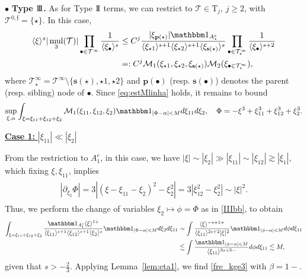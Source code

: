 \documentclass[a4paper,
11pt,  reqno]{amsart}
\newcommand{\II}{\textup{I \hspace{-2.9mm} I} }
\newcommand{\III}{\textup{I \hspace{-2.9mm} I \hspace{-2.9mm} I}}
\newcommand{\5}{\textup{V}}
\newcommand{\noi}{\noindent}
\newcommand{\ind}{\mathbbm 1}
\newcommand{\les}{\lesssim}
\theoremstyle{remark}
\newcommand{\bul}{\bullet}
\newcommand{\TT}{\mathcal{T}}
\newcommand{\Tr}{\mathrm{T}}
\newcommand{\al}{\alpha}
\newcommand{\be}{\beta}
\newcommand{\pb}{\mathbf{p}}
\newcommand{\sbf}{\mathbf{s}}
\newcommand{\ges}{\gtrsim}
\newcommand{\jb}[1]
{\langle #1 \rangle}
\newcommand{\ff}{\mathfrak{f}}
\DeclareMathOperator{\mul}{mul}
\numberwithin{equation}{section}
\numberwithin{theorem}{section}
\begin{document}
\smallskip

\noi
$\bul$ \textbf{Type $\III$.} As for Type $\II$ terms, we can restrict to $\TT\in \Tr_j$, $j\ge 2$,  with $\TT^{0,\ff}=\{\star\}$. In this case,
\begin{align}
    \jb{\xi}^s | \mul_3 (\TT)|
    \prod_{\bul \in \TT^\infty} \frac{1}{\jb{\xi_\bul}^s}
    &
    \le
    {C^j}
    \frac{|\xi_{\pb(\star)}|  \ind_{A_\star^c} }{ \jb{\xi_{\star1}}^{s+1} \jb{\xi_{\star2}}^{s+1} \jb{\xi_{\sbf(\star)}}^s} \prod_{\bul \in \TT^\infty_\star} \frac{1}{\jb{\xi_\bul}^{s+2}}
    \\
    &=: {C^j}
    \mathcal{M}_1(\xi_{\star1}, \xi_{\star2}, \xi_{\sbf(\star)})\mathcal{M}_2(\xi_{\bul\in \TT^\infty_\star})
    ,
\end{align}
where $\TT_\star^\infty=\TT^\infty\setminus\{\sbf(\star),\star1,\star2\}$ and $\pb(\bul)$ (resp. $\sbf(\bul)$) denotes the parent (resp. sibling) node of $\bul$. Since \eqref{eq:estMlinha} holds, it remains to bound
\begin{align}
\label{IIIbb}
\sup_{\xi, \alpha}
\int_{\xi=\xi_{11}+\xi_{12}+\xi_2} \mathcal{M}_1(\xi_{11}, \xi_{12}, \xi_{2})\ind_{|\Phi - \al| < M} d\xi_{11} d\xi_{2},\quad \Phi=-\xi^3+\xi_{11}^3+\xi_{12}^3+\xi_2^3.
\end{align}



\smallskip
\noi
\underline{\textbf{Case 1:} $|\xi_{11}| \ll |\xi_2|$}

{From the restriction to $A_1^c$,}
in this case, we have $|\xi| \sim |\xi_2| \gg  |\xi_{11}| \sim |\xi_{12}| \ges |\xi_1|$, which fixing $\xi, \xi_{11}$, implies
\begin{align}\label{IIIb}
\begin{split}
|
\partial_{\xi_{2}} \Phi|
= 3 | (\xi-\xi_{11}-\xi_2)^2 - \xi_2^2|
=3|\xi_{12}^2 - \xi_2^2|
\sim |\xi|^2.
\end{split}
\end{align}
Thus, we perform the change of variables $\xi_2 \mapsto \phi = \Phi$ as in \eqref{IIIbb}, to obtain
\begin{align}
\int_{\xi=\xi_{11} + \xi_{12} + \xi_2} \frac{ \ind_{A_1^c} \jb{\xi}^{1 + }  }{ \jb{\xi_{11}}^{s+1  } \jb{\xi_{12}}^{s+1} \jb{\xi_{2}}^s }
\ind_{|\Phi - \al| < M}
 d\xi_2 d\xi_{11}
&
\sim \int \frac{ \jb{\xi}^{  - s +  1 + } }{ \jb{\xi_{11}}^{2s+2} |\xi|^2  } \ind_{|\phi - \al| < M } d\phi d\xi_{11}
\\
&
\les \int \frac{\ind_{|\phi - \al|< M }}{ \jb{\xi_{11}}^{3s+3 - } } d\phi d\xi_{11} \les M,
\end{align}
given that $s>-\frac23$. Applying Lemma~\ref{lem:eta1}, we find \eqref{fre_kge3} with $\be=1-$.
\end{document}
